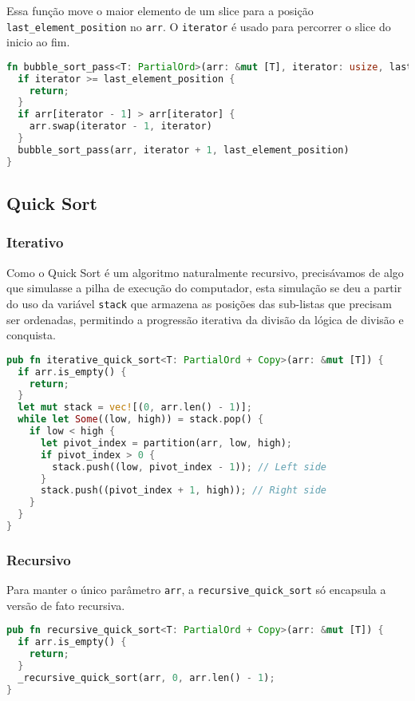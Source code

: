 Essa função move o maior elemento de um slice para a posição \texttt{last\_element\_position} no \texttt{arr}. O \texttt{iterator} é usado para percorrer o slice do inicio ao fim.

\begin{lstlisting}[language=Rust]
fn bubble_sort_pass<T: PartialOrd>(arr: &mut [T], iterator: usize, last_element_position: usize) {
  if iterator >= last_element_position {
    return;
  }
  if arr[iterator - 1] > arr[iterator] {
    arr.swap(iterator - 1, iterator)
  }
  bubble_sort_pass(arr, iterator + 1, last_element_position)
}
\end{lstlisting}
\FloatBarrier

\subsection{Quick Sort}

\subsubsection{Iterativo}

Como o Quick Sort é um algoritmo naturalmente recursivo, precisávamos de algo que simulasse a pilha de execução do computador, esta simulação se deu a partir do uso da variável \texttt{stack} que armazena as posições das sub-listas que precisam ser ordenadas, permitindo a progressão iterativa da divisão da lógica de divisão e conquista.

\begin{lstlisting}[language=Rust]
pub fn iterative_quick_sort<T: PartialOrd + Copy>(arr: &mut [T]) {
  if arr.is_empty() {
    return;
  }
  let mut stack = vec![(0, arr.len() - 1)];
  while let Some((low, high)) = stack.pop() {
    if low < high {
      let pivot_index = partition(arr, low, high);
      if pivot_index > 0 {
        stack.push((low, pivot_index - 1)); // Left side
      }
      stack.push((pivot_index + 1, high)); // Right side
    }
  }
}
\end{lstlisting}
\FloatBarrier

\subsubsection{Recursivo}

Para manter o único parâmetro \texttt{arr}, a \texttt{recursive\_quick\_sort} só encapsula a versão de fato recursiva.

\begin{lstlisting}[language=Rust]
pub fn recursive_quick_sort<T: PartialOrd + Copy>(arr: &mut [T]) {
  if arr.is_empty() {
    return;
  }
  _recursive_quick_sort(arr, 0, arr.len() - 1);
}
\end{lstlisting}
\FloatBarrier

